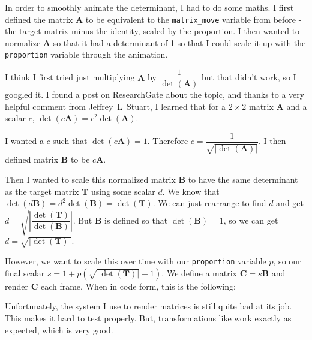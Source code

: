 \documentclass[../development.tex]{subfiles}
\begin{document}
In order to smoothly animate the determinant, I had to do some maths. I first defined the matrix $\mathbf{A}$ to be equivalent to the \texttt{matrix_move} variable from before - the target matrix minus the identity, scaled by the proportion. I then wanted to normalize $\mathbf{A}$ so that it had a determinant of 1 so that I could scale it up with the \texttt{proportion} variable through the animation.

I think I first tried just multiplying $\mathbf{A}$ by $\dfrac{1}{\det(\mathbf{A})}$ but that didn't work, so I googled it. I found a post\cite{researchgate-normalize-determinant} on ResearchGate about the topic, and thanks to a very helpful comment from Jeffrey~L~Stuart, I learned that for a $2 \times 2$ matrix $\mathbf{A}$ and a scalar $c$, $\det(c \mathbf{A}) = c^2 \det(\mathbf{A})$.

I wanted a $c$ such that $\det(c \mathbf{A}) = 1$. Therefore $c = \dfrac{1}{\sqrt{|\det(\mathbf{A})|}}$. I then defined matrix $\mathbf{B}$ to be $c\mathbf{A}$.

Then I wanted to scale this normalized matrix $\mathbf{B}$ to have the same determinant as the target matrix $\mathbf{T}$ using some scalar $d$. We know that $\det(d \mathbf{B}) = d^2 \det(\mathbf{B}) = \det(\mathbf{T})$. We can just rearrange to find $d$ and get $d = \sqrt{\left|\dfrac{\det(\mathbf{T})}{\det(\mathbf{B})}\right|}$. But $\mathbf{B}$ is defined so that $\det(\mathbf{B}) = 1$, so we can get $d = \sqrt{|\det(\mathbf{T})|}$.

However, we want to scale this over time with our \texttt{proportion} variable $p$, so our final scalar $s = 1 + p \left(\sqrt{|\det(\mathbf{T})|} - 1\right)$. We define a matrix $\mathbf{C} = s \mathbf{B}$ and render $\mathbf{C}$ each frame. When in code form, this is the following:


Unfortunately, the system I use to render matrices is still quite bad at its job. This makes it hard to test properly. But, transformations like  work exactly as expected, which is very good.
\end{document}
